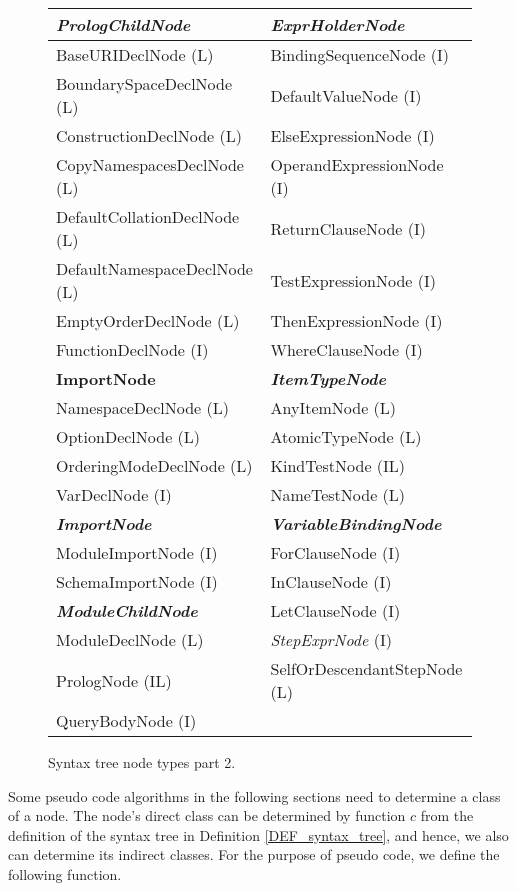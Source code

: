 \begin{figure}
\caption{Syntax tree node types part 2.}
\label{FIG_syntax_tree_node_types_part_2}
\begin{tabular}{l | l}
\textbf{\emph{PrologChildNode}} & \textbf{\emph{ExprHolderNode}} \\
\hline
BaseURIDeclNode (L) & BindingSequenceNode (I) \\
BoundarySpaceDeclNode (L) & DefaultValueNode (I) \\
ConstructionDeclNode (L) & ElseExpressionNode (I) \\
CopyNamespacesDeclNode (L) & OperandExpressionNode (I) \\
DefaultCollationDeclNode (L) & ReturnClauseNode (I) \\
DefaultNamespaceDeclNode (L) & TestExpressionNode (I) \\
EmptyOrderDeclNode (L) & ThenExpressionNode (I) \\
FunctionDeclNode (I) & WhereClauseNode (I) \\
\cline{2-2} \textbf{ImportNode} & \textbf{\emph{ItemTypeNode}} \\
\cline{2-2} NamespaceDeclNode (L) & AnyItemNode (L) \\
OptionDeclNode (L) & AtomicTypeNode (L) \\
OrderingModeDeclNode (L) & KindTestNode (IL) \\
VarDeclNode (I) & NameTestNode (L) \\
\cline{1-2} \textbf{\emph{ImportNode}} & \textbf{\emph{VariableBindingNode}} \\
\cline{1-2} ModuleImportNode (I) & ForClauseNode (I) \\
SchemaImportNode (I) & InClauseNode (I) \\
\cline{1-1} \textbf{\emph{ModuleChildNode}} & LetClauseNode (I) \\
\cline{1-2} ModuleDeclNode (L) & \emph{StepExprNode} (I) \\
\cline{2-2}PrologNode (IL) & SelfOrDescendantStepNode (L) \\
QueryBodyNode (I) & 
\end{tabular}
\end{figure}

Some pseudo code algorithms in the following sections need to determine a class of a node. The node's direct class can be determined by function $c$ from the definition of the syntax tree in Definition \ref{DEF_syntax_tree}, and hence, we also can determine its indirect classes. For the purpose of pseudo code, we define the following function.

